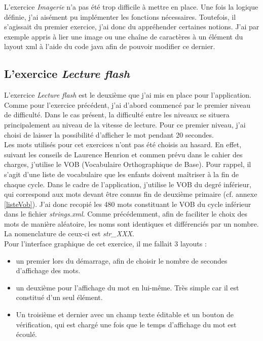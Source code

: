 L'exercice \textit{Imagerie} n'a pas été trop difficile à mettre en place. Une fois la logique définie, j'ai aisément pu implémenter les fonctions nécessaires. Toutefois, il s'agissait du premier exercice, j'ai donc du appréhender certaines notions. J'ai par exemple appris à lier une image ou une chaîne de caractères à un élément du layout xml à l'aide du code java afin de pouvoir modifier ce dernier.

\subsection{L'exercice \textit{Lecture flash}}
L'exercice \textit{Lecture flash} est le deuxième que j'ai mis en place pour l'application. Comme pour l'exercice précédent, j'ai d'abord commencé par le premier niveau de difficulté. Dans le cas présent, la difficulté entre les niveaux se situera principalement au niveau de la vitesse de lecture. Pour ce premier niveau, j'ai choisi de laisser la possibilité d'afficher le mot pendant 20 secondes.\\

Les mots utilisés pour cet exercices n'ont pas été choisis au hasard. En effet, suivant les conseils de Laurence Henrion et commen prévu dans le cahier des charges, j'utilise le VOB (Vocabulaire Orthographique de Base). Pour rappel, il s'agit d'une liste de vocabulaire que les enfants doivent maîtriser à la fin de chaque cycle. Dans le cadre de l'application, j'utilise le VOB du degré inférieur, qui correspond aux mots devant être connus fin de deuxième primaire (cf. annexe \ref{listeVob}). J'ai donc recopié les 480 mots constituant le VOB du cycle inférieur dans le fichier \textit{strings.xml}. Comme précédemment, afin de faciliter le choix des mots de manière aléatoire, les noms sont identiques et différenciés par un nombre. La nomenclature de ceux-ci est \textit{str\_XXX}. \\

Pour l'interface graphique de cet exercice, il me fallait 3 layouts :
\begin{itemize}
\item un premier lors du démarrage, afin de choisir le nombre de secondes d'affichage des mots.
\item un deuxième pour l'affichage du mot en lui-même. Très simple car il est constitué d'un seul élément.
\item Un troisième et dernier avec un champ texte éditable et un bouton de vérification, qui est chargé une fois que le temps d'affichage du mot est écoulé.\\
\end{itemize}


